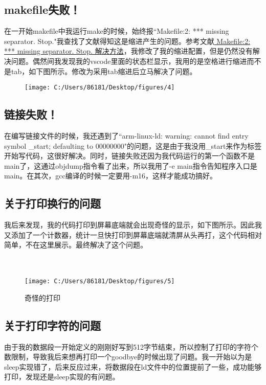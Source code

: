 \documentclass{LabReport}
\begin{document}
	\subsection{makefile失败！}
	在一开始makefile中我运行make的时候，始终报``Makefile:2: *** missing separator. Stop."我查找了文献得知这是缩进产生的问题。参考文献\href{https://blog.csdn.net/huamei13/article/details/106135901/}{\color{blue} Makefile:2: *** missing separator. Stop. 解决方法}，我修改了我的缩进配置，但是仍然没有解决问题。偶然间我发现我的vscode里面的状态栏显示，我用的是空格进行缩进而不是tab，如下图所示。修改为采用tab缩进后立马解决了问题。
\begin{figure}[h!]
	\centering
	\texttt{[image: C:/Users/86181/Desktop/figures/4]}
	\label{fig:4}
\end{figure}
	
	
	\subsection{链接失败！}
	在编写链接文件的时候，我还遇到了``arm-linux-ld: warning: cannot find entry symbol \_start; defaulting to 00000000"的问题，这是由于我没用\_start来作为标签开始写代码，这很好解决。同时，链接失败还因为我代码运行的第一个函数不是main了，这通过objdump指令看了出来，所以我用了-e main指令告知程序入口是main。在其次，gcc编译的时候一定要用-m16，这样才能成功搞好。
	
	\subsection{关于打印换行的问题}
	我后来发现，我的代码打印到屏幕底端就会出现奇怪的显示，如下图所示。因此我又添加了一个计数器，统计一旦快打印到屏幕底端就清屏从头再打，这个代码相对简单，不在这里展示。最终解决了这个问题。\\\\\\
\begin{figure}[h!]
	\centering
	\texttt{[image: C:/Users/86181/Desktop/figures/5]}
	\caption{奇怪的打印}
	\label{fig:5}
\end{figure}

	\subsection{关于打印字符的问题}
	由于我的数据段一开始定义的刚刚好写到512字节结束，所以控制了打印的字符个数限制，导致我后来想再打印一个goodbye的时候出现了问题。我一开始以为是sleep实现错了，后来反应过来，将数据段在ld文件中的位置提前了一些，成功能够打印，发现还是sleep实现的有问题。
	
\end{document}

